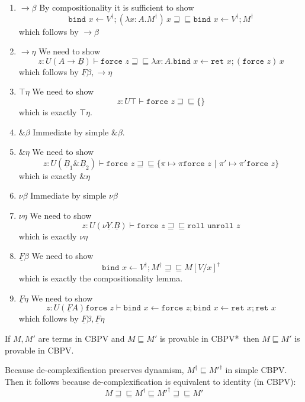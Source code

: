 \documentclass[acmsmall,nonacm]{acmart}
\renewcommand{\u}{\underline}
\newcommand{\cbpvstar}{CBPV*}
\newcommand{\pipe}{\,\,|\,\,}
\newcommand{\ltdyn}{\sqsubseteq}
\newcommand{\gtdyn}{\sqsupseteq}
\newcommand{\equidyn}{\mathrel{\gtdyn\ltdyn}}
\newcommand{\simp}[1]{{#1}^{\dag}}
\newcommand{\pair}[2]{\{ \pi \mapsto {#1} \pipe \pi' \mapsto {#2}\}}
\newcommand{\roll}{\kw{roll}}
\newcommand{\unroll}{\kw{unroll}}
\newcommand{\bindXtoYinZ}[2]{\kw{bind}#2 \leftarrow #1;}
\newcommand{\kw}[1]{\texttt{#1}\,\,}
\newcommand{\ret}{\kw{ret}}
\newcommand{\thunk}{\kw{thunk}}
\newcommand{\force}{\kw{force}}
\newcommand{\with}{\mathbin{\&}}
\begin{document}
{\begin{longonly}
\begin{longproof}
\begin{enumerate}
    By compositionality it is sufficient to show
    \[ \simp V \equidyn \bindXtoYinZ {\simp V} x \ret\thunk{(\bindXtoYinZ {\ret x} x \force x)}\]
    which follows by $U\eta$ and some simple reductions:
    \begin{align*}
      \bindXtoYinZ {\simp V} x \ret\thunk{(\bindXtoYinZ {\ret x} x \force x)}\\
      &\equidyn \bindXtoYinZ {\simp V} x\ret\thunk{\force x}\tag{$\u F\beta$}\\
      &\equidyn \bindXtoYinZ {\simp V} x\ret x\tag{$U\eta$}\\
      &\equidyn \simp V\tag{$\u F\eta$}
    \end{align*}
  \item $\to\beta$
    By compositionality it is sufficient to show
    \[ \bindXtoYinZ {\simp V} x (\lambda x:A. \simp M)\,x
    \equidyn \bindXtoYinZ {\simp V} x \simp M \]
    which follows by $\to\beta$
  \item $\to\eta$ We need to show
    \[ z : U(A \to \u B) \vdash
    \force z \equidyn
    \lambda x:A. \bindXtoYinZ {\ret x} x (\force z)\,x
    \]
    which follows by $\u F\beta, \to\eta$
  \item $\top\eta$ We need to show
    \[ z : U\top \vdash \force z \equidyn \{\} \]
    which is exactly $\top\eta$.
  \item $\with\beta$ Immediate by simple $\with\beta$.
  \item $\with\eta$ We need to show
    \[ z : U(\u B_1\with\u B_2) \vdash \force z \equidyn \pair{\pi\force z}{\pi'\force z}\]
    which is exactly $\with\eta$
  \item $\nu\beta$ Immediate by simple $\nu\beta$
  \item $\nu\eta$ We need to show
    \[ z : U(\nu \u Y. \u B) \vdash \force z \equidyn \roll\unroll z \]
    which is exactly $\nu\eta$
  \item $\u F\beta$
    We need to show
    \[ \bindXtoYinZ {\simp V} x \simp M \equidyn \simp{M[V/x]}\]
    which is exactly the compositionality lemma.
  \item $\u F\eta$ We need to show
    \[ z : U(\u F A)\force z \vdash \bindXtoYinZ {\force z} x \bindXtoYinZ {\ret x} x \ret x \]
    which follows by $\u F\beta,\u F\eta$
  \end{enumerate}
\end{longproof}

\begin{theorem}
  If $M, M'$ are terms in CBPV and $M \ltdyn M'$ is provable in \cbpvstar\ 
  then $M \ltdyn M'$ is provable in CBPV.
\end{theorem}
\begin{longproof}
  Because de-complexification preserves dynamism, $\simp M \ltdyn
  \simp{M'}$ in simple CBPV. Then it follows because
  de-complexification is equivalent to identity (in CBPV):
  \[ M \equidyn \simp M \ltdyn \simp {M'} \equidyn M' \]
\end{longproof}
\end{longonly}

}
\end{document}
